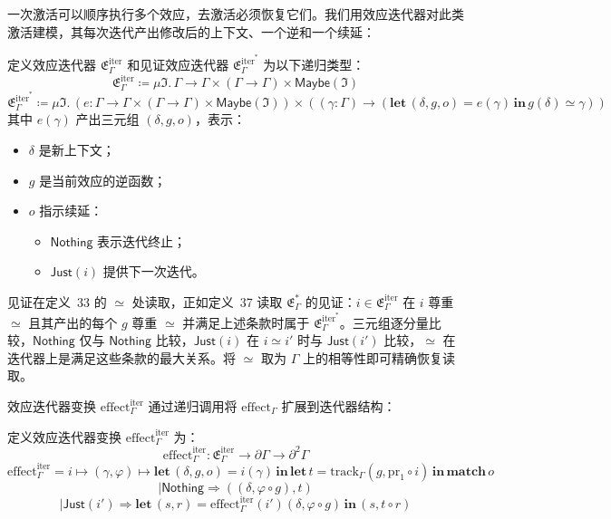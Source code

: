一次激活可以顺序执行多个效应，去激活必须恢复它们。我们用效应迭代器对此类激活建模，其每次迭代产出修改后的上下文、一个逆和一个续延：

\begin{definition}\label{def:4.9}
定义效应迭代器 $\mathfrak{E}^{\mathrm{iter}}_\Gamma$ 和见证效应迭代器 $\mathfrak{E}^{\mathrm{iter}^*}_\Gamma$ 为以下递归类型：
\begin{equation}\label{eq:4.11}
\mathfrak{E}^{\mathrm{iter}}_\Gamma \coloneqq \mu \mathfrak{I}.\, \Gamma \to \Gamma \times (\Gamma \to \Gamma) \times \mathsf{Maybe}(\mathfrak{I})
\end{equation}
\begin{equation}\label{eq:4.12}
\mathfrak{E}^{\mathrm{iter}^*}_\Gamma \coloneqq \mu \mathfrak{I}.\, (e: \Gamma \to \Gamma \times (\Gamma \to \Gamma) \times \mathsf{Maybe}(\mathfrak{I})) \times ((\gamma: \Gamma) \to (\mathbf{let}\,(\delta, g, o) = e(\gamma)\,\mathbf{in}\, g(\delta) \simeq \gamma))
\end{equation}
其中 $e(\gamma)$ 产出三元组 $(\delta, g, o)$，表示：
\begin{itemize}
\item $\delta$ 是新上下文；
\item $g$ 是当前效应的逆函数；
\item $o$ 指示续延：
\begin{itemize}
\item $\mathsf{Nothing}$ 表示迭代终止；
\item $\mathsf{Just}(i)$ 提供下一次迭代。
\end{itemize}
\end{itemize}
见证在定义~33 的 $\simeq$ 处读取，正如定义~37 读取 $\mathfrak{E}^*_\Gamma$ 的见证：$i \in \mathfrak{E}^{\mathrm{iter}}_\Gamma$ 在 $i$ 尊重 $\simeq$ 且其产出的每个 $g$ 尊重 $\simeq$ 并满足上述条款时属于 $\mathfrak{E}^{\mathrm{iter}^*}_\Gamma$。三元组逐分量比较，$\mathsf{Nothing}$ 仅与 $\mathsf{Nothing}$ 比较，$\mathsf{Just}(i)$ 在 $i \simeq i'$ 时与 $\mathsf{Just}(i')$ 比较，$\simeq$ 在迭代器上是满足这些条款的最大关系。将 $\simeq$ 取为 $\Gamma$ 上的相等性即可精确恢复读取。
\end{definition}

效应迭代器变换 $\mathrm{effect}^{\mathrm{iter}}_\Gamma$ 通过递归调用将 $\mathrm{effect}_\Gamma$ 扩展到迭代器结构：

\begin{definition}\label{def:4.10}
定义效应迭代器变换 $\mathrm{effect}^{\mathrm{iter}}_\Gamma$ 为：
\begin{equation}\label{eq:4.13}
\mathrm{effect}^{\mathrm{iter}}_\Gamma: \mathfrak{E}^{\mathrm{iter}}_\Gamma \to \partial\Gamma \to \partial^2\Gamma
\end{equation}
\[
\mathrm{effect}^{\mathrm{iter}}_\Gamma = i \mapsto (\gamma, \varphi) \mapsto \mathbf{let}\,(\delta, g, o) = i(\gamma)\,\mathbf{in}\, \mathbf{let}\,t = \mathrm{track}_\Gamma(g, \mathrm{pr}_1 \circ i)\,\mathbf{in}\, \mathbf{match}\,o
\]
\[
\mid \mathsf{Nothing} \Rightarrow ((\delta, \varphi \circ g), t)
\]
\[
\mid \mathsf{Just}(i') \Rightarrow \mathbf{let}\,(s, r) = \mathrm{effect}^{\mathrm{iter}}_\Gamma(i')(\delta, \varphi \circ g)\,\mathbf{in}\, (s, t \circ r)
\]
\end{definition}

